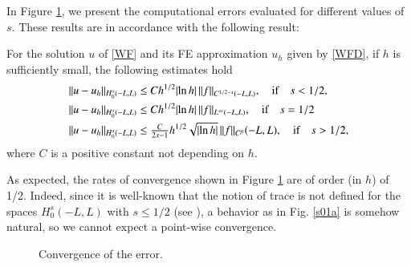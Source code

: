In Figure \ref{error}, we present the computational errors evaluated for different values of $s$. These results are in accordance with the following result: 
%
\begin{theorem}
%
For the solution $u$ of \eqref{WF} and its FE approximation $u_h$ given by \eqref{WFD}, if $h$ is sufficiently small, the following estimates hold
%
\begin{align*}
&\|u-u_h\|_{H^s_0(-L,L)}\leq C h^{1/2}|\!\ln h|\,\|f\|_{C^{1/2-s}(-L,L)}, \quad \textnormal{if}\quad s<1/2, \\
&\|u-u_h\|_{H^s_0(-L,L)}\leq C h^{1/2} |\!\ln h|\, \|f\|_{L^\infty(-L,L)}, \quad \textnormal{if}\quad  s=1/2 \\
&\|u-u_h\|_{H^s_0(-L,L)}\leq \tfrac{C}{2s-1} h^{1/2} \sqrt{|\!\ln h|}\, \|f\|_{C^\beta}(-L,L), \quad \textnormal{if} \quad s>1/2,
\end{align*}
%
where $C$ is a positive constant not depending on $h$. 
%
\end{theorem}

As expected, the rates of convergence shown in Figure \ref{error} are of order (in $h$) of 1/2. Indeed, since it is well-known that the notion of trace is not defined for the spaces $H^s_0(-L,L)$ with $s\leq 1/2$ (see \cite{lions1968problemes,tartar2007introduction}), a behavior as in Fig. \ref{s01a} is somehow natural, so we cannot expect a point-wise convergence. 
%
\begin{figure}
 \centering
%
\caption{Convergence of the error.}
\label{error}
\end{figure}

